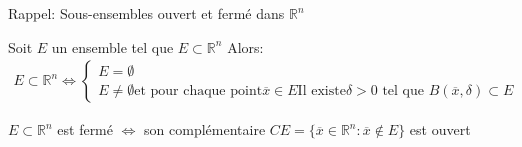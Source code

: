 
\begin{parag}{Rappel: Sous-ensembles ouvert et fermé dans $ \mathbb{R}^n $}
    \begin{definition}
      Soit $E$ un ensemble tel que $E \subset \mathbb{R}^n $ Alors:
      \begin{align*}
          E \subset \mathbb{R}^n  \iff \begin{cases}
              E = \emptyset \\
              E \neq \emptyset \text{et pour chaque point} \overline{x} \in E \text{Il existe} \delta > 0 \text{ tel que } B( \overline{x}, \delta) \subset E
          \end{cases}
      \end{align*}
      
    \end{definition}
    \begin{definition}
        $E \subset \mathbb{R}^n $ est fermé $ \iff$ son complémentaire $CE = \{ \overline{x} \in \mathbb{R}^n : \overline{x} \notin E\}$ est ouvert
    \end{definition}
\end{parag}

